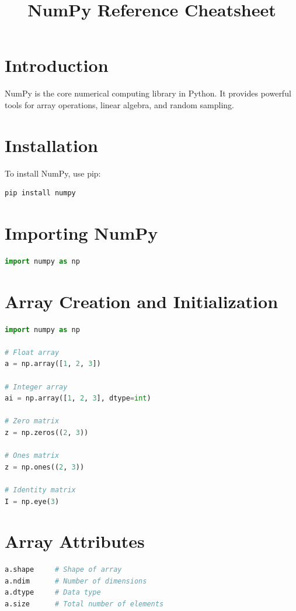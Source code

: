 \documentclass{article}
\title{NumPy Reference Cheatsheet}
\date{}
\begin{document}
\maketitle

\section{Introduction}
NumPy is the core numerical computing library in Python. It provides powerful tools for array operations, linear algebra, and random sampling.

\section{Installation}
To install NumPy, use pip:
\begin{lstlisting}[language=bash]
pip install numpy
\end{lstlisting}

\section{Importing NumPy}
\begin{lstlisting}[language=Python]
import numpy as np
\end{lstlisting}

\section{Array Creation and Initialization}
\begin{lstlisting}[language=Python]
import numpy as np

# Float array
a = np.array([1, 2, 3])

# Integer array
ai = np.array([1, 2, 3], dtype=int)

# Zero matrix
z = np.zeros((2, 3))

# Ones matrix
z = np.ones((2, 3))

# Identity matrix
I = np.eye(3)

\end{lstlisting}


\section{Array Attributes}
\begin{lstlisting}[language=Python]
a.shape     # Shape of array
a.ndim      # Number of dimensions
a.dtype     # Data type
a.size      # Total number of elements
\end{lstlisting}
\end{document}
